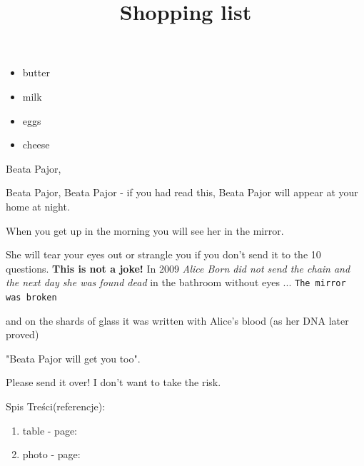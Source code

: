 \begin{Huge}
\begin{center}
    \title{Shopping list}
\end{center}
\end{Huge}
\begin{itemize}
    \item butter
    \item milk
    \item eggs
    \item cheese
\end{itemize}
\vspace{5mm} 




\begin{Huge}Beata Pajor, \end{Huge} Beata Pajor, Beata Pajor - if you had read this, Beata Pajor will appear at your home at night. \begin{tiny}When you get up in the morning you will see her in the mirror.\end{tiny} She will tear your eyes out or strangle you if you don't send it to the 10 questions.  \textbf{This is not a joke!}  In 2009 \textit{Alice Born did not send the chain and the next day she was found dead}  in the bathroom without eyes ...  \texttt{The mirror was broken}
\begin{center}
and on the shards of glass it was written with Alice's blood (as her DNA later proved)
\end{center}
\begin{flushright}
"Beata Pajor will get you too".
\end{flushright}
\begin{flushleft}
Please send it over! I don't want to take the risk.\end{flushleft}
\begin{Large} Spis Treści(referencje): \end{Large}
\begin{enumerate}
\item table - page: \pageref{tab:my_label}
\item photo - page: \pageref{fig:Sniper Monkey}
\end{enumerate}
